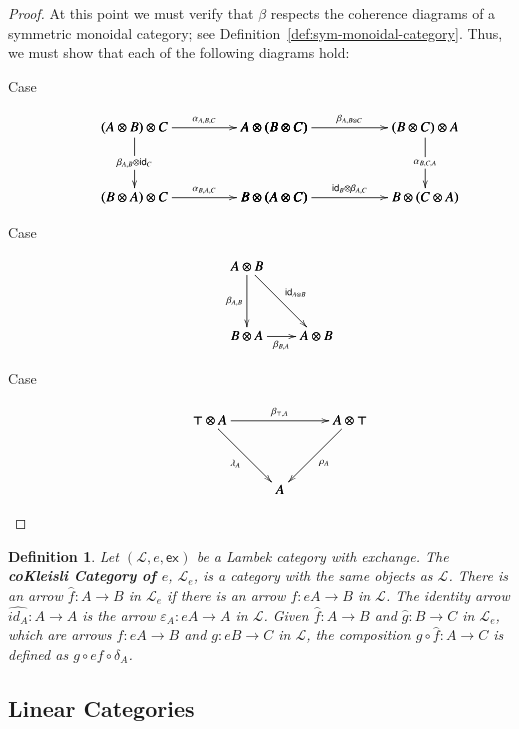\documentclass{article}
\newtheorem{definition}[theorem]{Definition}
\let\mto\to
\let\to\relax
\newcommand{\to}{\rightarrow}
\newcommand{\cat}[1]{\mathcal{#1}}
\newcommand{\id}[0]{\mathsf{id}}
\newcommand{\e}[1]{\mathsf{ex}_{#1}}
\begin{document}
\begin{proof}
  At this point we must verify that $\beta$ respects the coherence
  diagrams of a symmetric monoidal category; see
  Definition~\ref{def:sym-monoidal-category}.  Thus, we must show that
  each of the following diagrams hold:
  \begin{description}
  \item[Case]
    \[
    \bfig
      \hSquares|aammmaa|/->`->`->``->`->`->/[
        (A \otimes B) \otimes C`
        A \otimes (B \otimes C)`
        (B \otimes C) \otimes A`
        (B \otimes A) \otimes C`
        B \otimes (A \otimes C)`
        B \otimes (C \otimes A);
        \alpha_{A,B,C}`
        \beta_{A,B \otimes C}`
        \beta_{A,B} \otimes \id_C``
        \alpha_{B,C,A}`
        \alpha_{B,A,C}`
        \id_B \otimes \beta_{A,C}]
      \efig      
      \]

    \item[Case]
      \[
      \bfig
      \btriangle[
        A \otimes B`
        B \otimes A`
        A \otimes B;
        \beta_{A,B}`
        \id_{A \otimes B}`
        \beta_{B,A}]
      \efig
      \]

    \item[Case]
      \[
      \bfig
      \Vtriangle[
        \top \otimes A`
        A \otimes \top`
        A;
        \beta_{\top,A}`
        \lambda_A`
        \rho_A]
      \efig
      \]
  \end{description}
\end{proof}

\begin{definition}
  \label{def:cokleisli-exchange}
  Let $(\cat{L},e,\e{})$ be a Lambek category with exchange. The
  \textbf{coKleisli Category of $e$}, $\cat{L}_e$, is a category with the
  same objects as $\cat{L}$. There is an arrow $\hat{f}:A\mto B$ in
  $\cat{L}_e$ if there is an arrow $f:eA\mto B$ in $\cat{L}$. The
  identity arrow $\hat{id_A}:A\mto A$ is the arrow
  $\varepsilon_A:eA\mto A$ in $\cat{L}$. Given $\hat{f}:A\mto B$ and
  $\hat{g}:B\mto C$ in $\cat{L}_e$, which are arrows
  $f:eA\mto B$ and $g:eB\mto C$ in $\cat{L}$, the composition
  $\hat{g}\circ\hat{f}:A\mto C$ is defined as $g\circ ef\circ\delta_A$.
\end{definition}


\subsection{Linear Categories}
\label{subsec:linear_categories}
\end{document}
